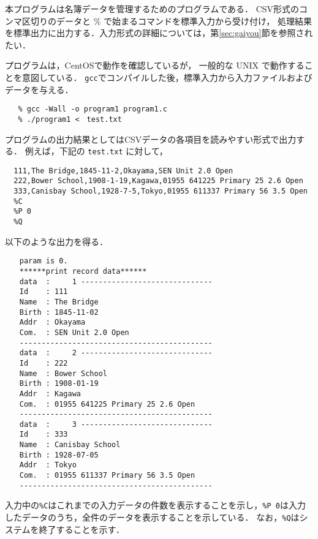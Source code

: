 \documentclass[a4j,11pt]{jarticle}
\begin{document}
本プログラムは名簿データを管理するためのプログラムである．
CSV形式のコンマ区切りのデータと \% で始まるコマンドを標準入力から受け付け，
処理結果を標準出力に出力する．入力形式の詳細については，第\ref{sec:gaiyou}節を参照されたい．

プログラムは，CentOSで動作を確認しているが，
一般的な UNIX で動作することを意図している．
\verb|gcc|でコンパイルした後，標準入力から入力ファイルおよびデータを与える．

{\fontsize{10pt}{11pt} \selectfont
 \begin{verbatim}
   % gcc -Wall -o program1 program1.c
   % ./program1 <　test.txt
 \end{verbatim}
}
プログラムの出力結果としてはCSVデータの各項目を読みやすい形式で出力する．
例えば，下記の \verb|test.txt| に対して，

{\fontsize{10pt}{11pt} \selectfont
 \begin{verbatim}
  111,The Bridge,1845-11-2,Okayama,SEN Unit 2.0 Open
  222,Bower School,1908-1-19,Kagawa,01955 641225 Primary 25 2.6 Open
  333,Canisbay School,1928-7-5,Tokyo,01955 611337 Primary 56 3.5 Open
  %C
  %P 0
  %Q
 \end{verbatim}
}
\noindent %
以下のような出力を得る．

{\fontsize{10pt}{11pt} \selectfont
 \begin{verbatim}
　　param is 0.
　　******print record data******
　　data  :     1 ------------------------------
　　Id    : 111
　　Name  : The Bridge
　　Birth : 1845-11-02
　　Addr  : Okayama
　　Com.  : SEN Unit 2.0 Open
　　--------------------------------------------
　　data  :     2 ------------------------------
　　Id    : 222
　　Name  : Bower School
　　Birth : 1908-01-19
　　Addr  : Kagawa
　　Com.  : 01955 641225 Primary 25 2.6 Open
　　--------------------------------------------
　　data  :     3 ------------------------------
　　Id    : 333
　　Name  : Canisbay School
　　Birth : 1928-07-05
　　Addr  : Tokyo
　　Com.  : 01955 611337 Primary 56 3.5 Open
　　--------------------------------------------

 \end{verbatim}
}

\noindent
入力中の\verb|%C|はこれまでの入力データの件数を表示することを示し，\verb|%P 0|は入力したデータのうち，全件のデータを表示することを示している．
なお，\verb|%Q|はシステムを終了することを示す．
\end{document}
